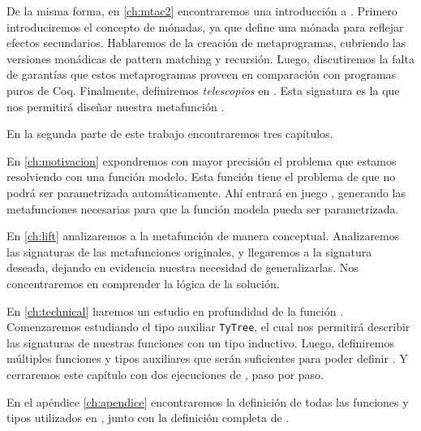 De la misma forma, en \ref{ch:mtac2} encontraremos una introducción a \Mtac.
Primero introduciremos el concepto de mónadas, ya que \mtac define una mónada para reflejar efectos secundarios.
Hablaremos de la creación de metaprogramas, cubriendo las versiones monádicas de pattern matching y recursión.
Luego, discutiremos la falta de garantías que estos metaprogramas proveen en comparación con programas puros de Coq.
Finalmente, definiremos \emph{telescopios} en \Mtac. Esta signatura es la que nos permitirá diseñar nuestra metafunción \lift.

En la segunda parte de este trabajo encontraremos tres capítulos.

En \ref{ch:motivacion} expondremos con mayor precisión el problema que estamos resolviendo con una función modelo.
Esta función tiene el problema de que no podrá ser parametrizada automáticamente.
Ahí entrará en juego \lift, generando las metafunciones necesarias para que la función modela pueda ser parametrizada.

En \ref{ch:lift} analizaremos a la metafunción \lift de manera conceptual.
Analizaremos las signaturas de las metafunciones originales, y llegaremos a la signatura deseada, dejando en evidencia nuestra necesidad de generalizarlas.
Nos concentraremos en comprender la lógica de la solución.

En \ref{ch:technical} haremos un estudio en profundidad de la función \lift.
Comenzaremos estudiando el tipo auxiliar \lstinline{TyTree}, el cual nos permitirá describir las signaturas de nuestras funciones con un tipo inductivo.
Luego, definiremos múltiples funciones y tipos auxiliares que serán suficientes para poder definir \lift.
Y cerraremos este capítulo con dos ejecuciones de \lift, paso por paso.

En el apéndice \ref{ch:apendice} encontraremos la definición de todas las funciones y tipos utilizados en \lift, junto con la definición completa de \lift.